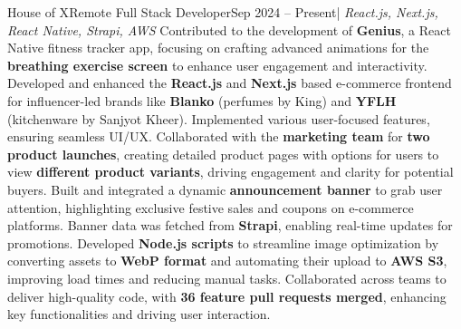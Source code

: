 \resumeSubheading
  {House of X}{Remote}
  {Full Stack Developer}{Sep 2024 -- Present}{| \textit{React.js, Next.js, React Native, Strapi, AWS}}
  \resumeItemListStart
    {Contributed to the development of \textbf{Genius}, a React Native fitness tracker app, focusing on crafting advanced animations for the \textbf{breathing exercise screen} to enhance user engagement and interactivity.}
    {Developed and enhanced the \textbf{React.js} and \textbf{Next.js} based e-commerce frontend for influencer-led brands like \textbf{Blanko} (perfumes by King) and \textbf{YFLH} (kitchenware by Sanjyot Kheer). Implemented various user-focused features, ensuring seamless UI/UX.}
    {Collaborated with the \textbf{marketing team} for \textbf{two product launches}, creating detailed product pages with options for users to view \textbf{different product variants}, driving engagement and clarity for potential buyers.}
    {Built and integrated a dynamic \textbf{announcement banner} to grab user attention, highlighting exclusive festive sales and coupons on e-commerce platforms. Banner data was fetched from \textbf{Strapi}, enabling real-time updates for promotions.}
    {Developed \textbf{Node.js scripts} to streamline image optimization by converting assets to \textbf{WebP format} and automating their upload to \textbf{AWS S3}, improving load times and reducing manual tasks.}
    {Collaborated across teams to deliver high-quality code, with \textbf{36 feature pull requests merged}, enhancing key functionalities and driving user interaction.}
  \resumeItemListEnd
